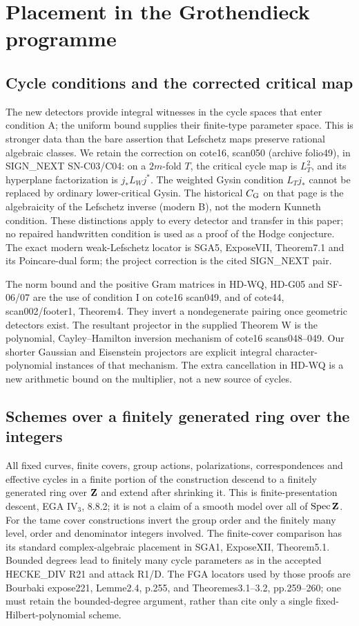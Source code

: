 \section{Placement in the Grothendieck programme}

\subsection{Cycle conditions and the corrected critical map}
The new detectors provide integral witnesses in the cycle spaces that
enter condition A; the uniform bound supplies their finite-type
parameter space. This is stronger data than the bare assertion that
Lefschetz maps preserve rational algebraic classes. We retain the
correction on cote16, scan050 (archive folio49), in SIGN\_NEXT
SN-C03/C04: on a $2m$-fold $T$, the critical cycle map is $L_T^2$, and
its hyperplane factorization is $j_*L_Wj^*$. The weighted Gysin
condition $L_Tj_*$ cannot be replaced by ordinary lower-critical Gysin.
The historical $C_{\rm G}$ on that page is the algebraicity of the
Lefschetz inverse (modern B), not the modern Kunneth condition.
These distinctions apply to every detector and transfer in this paper;
no repaired handwritten condition is used as a proof of the Hodge
conjecture. The exact modern weak-Lefschetz locator is SGA5, ExposeVII,
Theorem7.1 and its Poincare-dual form; the project correction is the
cited SIGN\_NEXT pair.

The norm bound and the positive Gram matrices in HD-WQ, HD-G05 and
SF-06/07 are the use of condition I on cote16 scan049, and of cote44,
scan002/footer1, Theorem4. They invert a nondegenerate pairing once
geometric detectors exist. The resultant projector in the supplied
Theorem W is the polynomial, Cayley--Hamilton inversion mechanism of
cote16 scans048--049. Our shorter Gaussian and Eisenstein projectors
are explicit integral character-polynomial instances of that mechanism.
The extra cancellation in HD-WQ is a new arithmetic bound on the
multiplier, not a new source of cycles.

\subsection{Schemes over a finitely generated ring over the integers}
All fixed curves, finite covers, group actions, polarizations,
correspondences and effective cycles in a finite portion of the
construction descend to a finitely generated ring over $\mathbf Z$ and extend
after shrinking it. This is finite-presentation descent, EGA IV$_3$,
8.8.2; it is not a claim of a smooth model over all of $\operatorname{Spec}\mathbf Z$.
For the tame cover constructions invert the group order and the
finitely many level, order and denominator integers involved. The
finite-cover comparison has its standard complex-algebraic placement
in SGA1, ExposeXII, Theorem5.1. Bounded degrees lead to finitely many
cycle parameters as in the accepted HECKE\_DIV R21 and attack R1/D.
The FGA locators used by those proofs are Bourbaki expose221,
Lemme2.4, p.255, and Theoremes3.1--3.2, pp.259--260; one must retain
the bounded-degree argument, rather than cite only a single
fixed-Hilbert-polynomial scheme.

